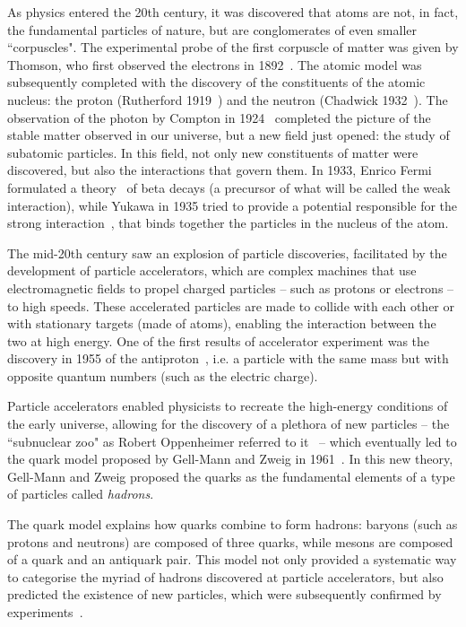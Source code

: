 As physics entered the 20th century, it was discovered that atoms are not, in fact, the fundamental particles of nature, but are conglomerates of even smaller ``corpuscles". The experimental probe of the first corpuscle of matter was given by Thomson, who first observed the electrons in 1892~\cite{doi:10.1080/14786449708621070}. The atomic model was subsequently completed with the discovery of the constituents of the atomic nucleus: the proton (Rutherford 1919~\cite{doi:10.1080/14786440608635919}) and the neutron (Chadwick 1932~\cite{Chadwick:1932ma}). The observation of the photon by Compton in 1924~\cite{PhysRev.21.483, PhysRev.24.591} completed the picture of the stable matter observed in our universe, but a new field just opened: the study of subatomic particles. In this field, not only new constituents of matter were discovered, but also the interactions that govern them. In 1933, Enrico Fermi formulated a theory~\cite{Fermi:1934hr} of beta decays (a precursor of what will be called the weak interaction), while Yukawa in 1935 tried to provide a potential responsible for the strong interaction~\cite{Yukawa:1935xg}, that binds together the particles in the nucleus of the atom. 

The mid-20th century saw an explosion of particle discoveries, facilitated by the development of particle accelerators, which are complex machines that use electromagnetic fields to propel charged particles -- such as protons or electrons -- to high speeds. These accelerated particles are made to collide with each other or with stationary targets (made of atoms), enabling the interaction between the two at high energy. One of the first results of accelerator experiment was the discovery in 1955 of the antiproton~\cite{PhysRev.100.947}, i.e. a particle with the same mass but with opposite quantum numbers (such as the electric charge). 

Particle accelerators enabled physicists to recreate the high-energy conditions of the early universe, allowing for the discovery of a plethora of new particles -- the ``subnuclear zoo" as Robert Oppenheimer referred to it~\cite{johnson2010strange} -- which eventually led to the quark model proposed by Gell-Mann and Zweig in 1961~\cite{Gell-Mann:1964ewy}. In this new theory,  Gell-Mann and Zweig proposed the quarks as the fundamental elements of a type of particles called \textit{hadrons}. 

The quark model explains how quarks combine to form hadrons: baryons (such as protons and neutrons) are composed of three quarks, while mesons are composed of a quark and an antiquark pair. This model not only provided a systematic way to categorise the myriad of hadrons discovered at particle accelerators, but also predicted the existence of new particles, which were subsequently confirmed by experiments~\cite{PhysRevLett.12.204}. 

